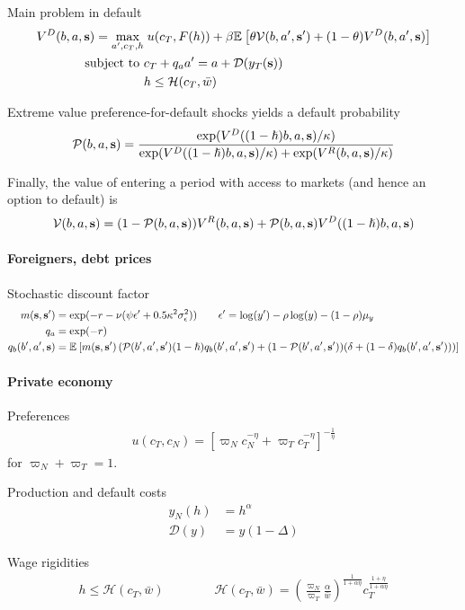 Main problem in default
\begin{align}
	V^D(b,a,\text{\textbf{s}}) = \max_{a',c_T, h} &\; u(c_T, F(h)) + \beta \mathbb{E}_{{}}\left[  \theta \mathcal{V}(b,a',\text{\textbf{s}}') + (1-\theta) V^D(b,a',\text{\textbf{s}})  \right] \\
	\text{subject to }
	& c_T + q_a a' = a + \mathcal{D}(y_T(\text{\textbf{s}})) \notag \\
	& h \leq \mathcal{H}(c_T, \bar{w}) \notag
\end{align}

Extreme value preference-for-default shocks yields a default probability
\begin{align}
	\mathcal{P}(b,a,\text{\textbf{s}}) = \frac{ \exp(V^D((1-\hslash)b,a,\text{\textbf{s}}) / \kappa) }{\exp(V^D((1-\hslash)b,a,\text{\textbf{s}}) / \kappa) + \exp(V^R(b,a,\text{\textbf{s}}) / \kappa)}
\end{align}

Finally, the value of entering a period with access to markets (and hence an option to default) is
\begin{align}
	\mathcal{V}(b,a,\text{\textbf{s}}) = (1-\mathcal{P}(b,a,\text{\textbf{s}})) V^R(b,a,\text{\textbf{s}}) + \mathcal{P}(b,a,\text{\textbf{s}}) V^D((1-\hslash)b,a,\text{\textbf{s}})
\end{align}

\paragraph{Foreigners, debt prices}
Stochastic discount factor
\begin{align}
	m(\text{\textbf{s}}, \text{\textbf{s}}') &= \exp(-r - \nu (\psi \epsilon' + 0.5 \kappa^2\sigma_\epsilon^2)) \qquad \epsilon' = \log(y') - \rho\log(y) - (1-\rho)\mu_y\\
	q_a &= \exp(-r) \\
	q_b(b',a',\text{\textbf{s}}) &= \mathbb{E}_{{}}\left[  m(\text{\textbf{s}},\text{\textbf{s}}') \left(\mathcal{P}(b',a',\text{\textbf{s}}') (1-\hslash) q_b(b',a',\text{\textbf{s}}') + (1-\mathcal{P}(b',a',\text{\textbf{s}}'))(\delta + (1-\delta)q_b(b',a',\text{\textbf{s}}')) \right)  \right]
\end{align}

\paragraph{Private economy}
Preferences
\begin{align}
	u(c_T,c_N) = \left[ \varpi_N c_N^{-\eta} + \varpi_T c_T^{-\eta} \right]^{-\frac{1}{\eta}}
\end{align}
for $\varpi_N + \varpi_T = 1$.

Production and default costs
\begin{align}
	y_N(h) &= h^\alpha \\
	\mathcal{D}(y) &= y (1-\Delta)
\end{align}

Wage rigidities
\begin{align}
	h \leq \mathcal{H}(c_T, \bar{w}) \qquad\qquad \mathcal{H}(c_T, \bar{w}) = \left(\frac{\varpi_N}{\varpi_T} \frac{\alpha}{\bar{w}}\right)^\frac{1}{1+\alpha\eta} c_T^\frac{1+\eta}{1+\alpha\eta}
\end{align}

